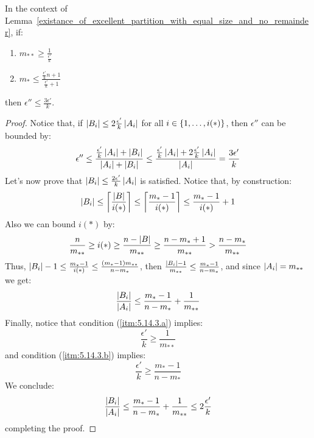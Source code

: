     \begin{remark}[Remark 5.14.3]\label{epsilons_proportion_can_be_k}
        In the context of Lemma~\ref{existance_of_excellent_partition_with_equal_size_and_no_remainder}, if:
        \begin{enumerate}[label=(\alph*), ref=\alph*]
            \item \label{itm:5.14.3.a} $m_{**} \geq \frac{1}{\frac{\epsilon'}{k}}$
            \item \label{itm:5.14.3.b} $m_* \leq \frac{\frac{\epsilon'}{k} n + 1}{\frac{\epsilon'}{k} + 1}$
        \end{enumerate}
        then $\epsilon'' \leq \frac{3 \epsilon'}{k}$.
        \begin{proof}
            Notice that, if $\left| B_i \right| \leq 2 \frac{\epsilon'}{k} \left| A_i \right|$ for all $i \in \left\{ 1, \dots, i(*) \right\}$,
            then $\epsilon''$ can be bounded by:
            $$
                \epsilon'' \leq \frac{\frac{\epsilon'}{k} \left| A_i \right| + \left| B_i \right|}{\left| A_i \right| + \left| B_i \right|}
                \leq \frac{\frac{\epsilon'}{k} \left| A_i \right| + 2 \frac{\epsilon'}{k} \left| A_i \right|}{\left| A_i \right|}
                = \frac{3 \epsilon'}{k}
            $$
            Let's now prove that $\left| B_i \right| \leq \frac{2 \epsilon'}{k} \left| A_i \right|$ is satisfied.
            Notice that, by construction:
            $$
                \left| B_i \right| \leq \left\lceil \frac{\left| B \right|}{i(*)} \right\rceil \leq \left\lceil \frac{m_* - 1}{i(*)} \right\rceil \leq
                \frac{m_* - 1}{i(*)} + 1
            $$
            Also we can bound $i(*)$ by:
            $$
                \frac{n}{m_{**}} \geq i(*) \geq \frac{n - \left| B \right|}{m_{**}} \geq \frac{n - m_* + 1}{m_{**}} >
                \frac{n - m_*}{m_{**}}
            $$
            Thus, $\left| B_i \right| - 1 \leq \frac{m_* - 1}{i(*)} \leq \frac{\left( m_* - 1 \right) m_{**}}{n - m_*}$,
            then $\frac{\left| B_i \right| - 1}{m_{**}} \leq \frac{m_* - 1}{n - m_*}$, and since $\left| A_i \right| = m_{**}$
            we get:
            $$
                \frac{\left| B_i \right|}{\left| A_i \right|} \leq \frac{m_* - 1}{n - m_*} + \frac{1}{m_{**}}
            $$
            Finally, notice that condition (\ref{itm:5.14.3.a}) implies:
            $$
                \frac{\epsilon'}{k} \geq \frac{1}{m_{**}}
            $$
            and condition (\ref{itm:5.14.3.b}) implies:
            $$
                \frac{\epsilon'}{k} \geq \frac{m_* - 1}{n - m_*}
            $$
            We conclude:
            $$
                \frac{\left| B_i \right|}{\left| A_i \right|} \leq \frac{m_* - 1}{n - m_*} + \frac{1}{m_{**}} \leq 2 \frac{\epsilon'}{k}
            $$
            completing the proof.
        \end{proof}
    \end{remark}


